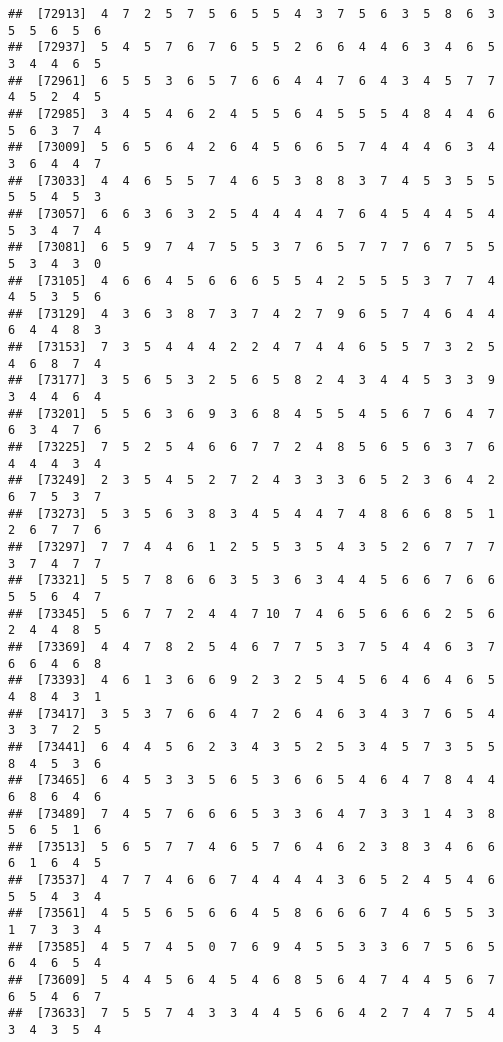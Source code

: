 \documentclass[
]{book}
\begin{document}
\begin{verbatim}
##  [72913]  4  7  2  5  7  5  6  5  5  4  3  7  5  6  3  5  8  6  3  5  5  6  5  6
##  [72937]  5  4  5  7  6  7  6  5  5  2  6  6  4  4  6  3  4  6  5  3  4  4  6  5
##  [72961]  6  5  5  3  6  5  7  6  6  4  4  7  6  4  3  4  5  7  7  4  5  2  4  5
##  [72985]  3  4  5  4  6  2  4  5  5  6  4  5  5  5  4  8  4  4  6  5  6  3  7  4
##  [73009]  5  6  5  6  4  2  6  4  5  6  6  5  7  4  4  4  6  3  4  3  6  4  4  7
##  [73033]  4  4  6  5  5  7  4  6  5  3  8  8  3  7  4  5  3  5  5  5  5  4  5  3
##  [73057]  6  6  3  6  3  2  5  4  4  4  4  7  6  4  5  4  4  5  4  5  3  4  7  4
##  [73081]  6  5  9  7  4  7  5  5  3  7  6  5  7  7  7  6  7  5  5  5  3  4  3  0
##  [73105]  4  6  6  4  5  6  6  6  5  5  4  2  5  5  5  3  7  7  4  4  5  3  5  6
##  [73129]  4  3  6  3  8  7  3  7  4  2  7  9  6  5  7  4  6  4  4  6  4  4  8  3
##  [73153]  7  3  5  4  4  4  2  2  4  7  4  4  6  5  5  7  3  2  5  4  6  8  7  4
##  [73177]  3  5  6  5  3  2  5  6  5  8  2  4  3  4  4  5  3  3  9  3  4  4  6  4
##  [73201]  5  5  6  3  6  9  3  6  8  4  5  5  4  5  6  7  6  4  7  6  3  4  7  6
##  [73225]  7  5  2  5  4  6  6  7  7  2  4  8  5  6  5  6  3  7  6  4  4  4  3  4
##  [73249]  2  3  5  4  5  2  7  2  4  3  3  3  6  5  2  3  6  4  2  6  7  5  3  7
##  [73273]  5  3  5  6  3  8  3  4  5  4  4  7  4  8  6  6  8  5  1  2  6  7  7  6
##  [73297]  7  7  4  4  6  1  2  5  5  3  5  4  3  5  2  6  7  7  7  3  7  4  7  7
##  [73321]  5  5  7  8  6  6  3  5  3  6  3  4  4  5  6  6  7  6  6  5  5  6  4  7
##  [73345]  5  6  7  7  2  4  4  7 10  7  4  6  5  6  6  6  2  5  6  2  4  4  8  5
##  [73369]  4  4  7  8  2  5  4  6  7  7  5  3  7  5  4  4  6  3  7  6  6  4  6  8
##  [73393]  4  6  1  3  6  6  9  2  3  2  5  4  5  6  4  6  4  6  5  4  8  4  3  1
##  [73417]  3  5  3  7  6  6  4  7  2  6  4  6  3  4  3  7  6  5  4  3  3  7  2  5
##  [73441]  6  4  4  5  6  2  3  4  3  5  2  5  3  4  5  7  3  5  5  8  4  5  3  6
##  [73465]  6  4  5  3  3  5  6  5  3  6  6  5  4  6  4  7  8  4  4  6  8  6  4  6
##  [73489]  7  4  5  7  6  6  6  5  3  3  6  4  7  3  3  1  4  3  8  5  6  5  1  6
##  [73513]  5  6  5  7  7  4  6  5  7  6  4  6  2  3  8  3  4  6  6  6  1  6  4  5
##  [73537]  4  7  7  4  6  6  7  4  4  4  4  3  6  5  2  4  5  4  6  5  5  4  3  4
##  [73561]  4  5  5  6  5  6  6  4  5  8  6  6  6  7  4  6  5  5  3  1  7  3  3  4
##  [73585]  4  5  7  4  5  0  7  6  9  4  5  5  3  3  6  7  5  6  5  6  4  6  5  4
##  [73609]  5  4  4  5  6  4  5  4  6  8  5  6  4  7  4  4  5  6  7  6  5  4  6  7
##  [73633]  7  5  5  7  4  3  3  4  4  5  6  6  4  2  7  4  7  5  4  3  4  3  5  4

\end{verbatim}
\end{document}
